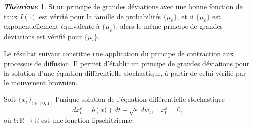 \documentclass[12pt,a4paper,twoside]{book}%
\theoremstyle{definition}
\newtheorem{thm}[dfn]{\textit{Théorème}}
\numberwithin{equation}{section}
\begin{document}
\begin{thm}
	Si un principe de grandes déviations avec une bonne fonction de taux $I(\cdot)$ 
	est vérifié pour la famille de probabilités $\{\mu_\varepsilon\}$, et si 
	$\{\mu_\varepsilon\}$ est exponentiellement équivalente à $\{\tilde{\mu}_\varepsilon\}$, 
	alors le même principe de grandes déviations est vérifié pour $\{\tilde{\mu}_\varepsilon\}$.
	
\end{thm}
Le résultat suivant constitue une application du principe de contraction aux processus de diffusion. Il permet d’établir un principe de grandes déviations pour la solution d’une équation différentielle stochastique, à partir de celui vérifié par le mouvement brownien.

Soit $\{x_t^\varepsilon\}_{t \in [0,1]}$ l’unique solution de l’équation différentielle stochastique
\[
dx_t^\varepsilon = b(x_t^\varepsilon)\,dt + \sqrt{\varepsilon}\,dw_t, \quad x_0^\varepsilon = 0,
\]
où $b : \mathbb{R} \to \mathbb{R}$ est une fonction lipschitzienne.
\end{document}
